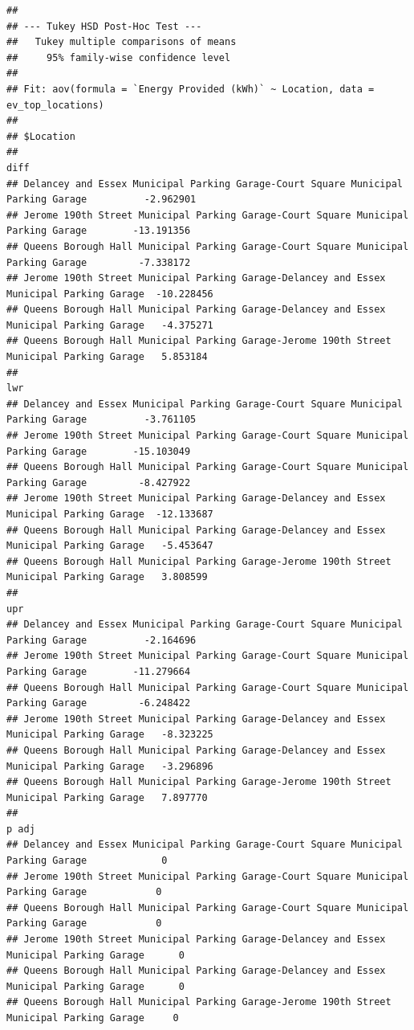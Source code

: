 \documentclass[
  12pt,
]{article}
\begin{document}
\begin{verbatim}
## 
## --- Tukey HSD Post-Hoc Test ---
##   Tukey multiple comparisons of means
##     95% family-wise confidence level
## 
## Fit: aov(formula = `Energy Provided (kWh)` ~ Location, data = ev_top_locations)
## 
## $Location
##                                                                                                 diff
## Delancey and Essex Municipal Parking Garage-Court Square Municipal Parking Garage          -2.962901
## Jerome 190th Street Municipal Parking Garage-Court Square Municipal Parking Garage        -13.191356
## Queens Borough Hall Municipal Parking Garage-Court Square Municipal Parking Garage         -7.338172
## Jerome 190th Street Municipal Parking Garage-Delancey and Essex Municipal Parking Garage  -10.228456
## Queens Borough Hall Municipal Parking Garage-Delancey and Essex Municipal Parking Garage   -4.375271
## Queens Borough Hall Municipal Parking Garage-Jerome 190th Street Municipal Parking Garage   5.853184
##                                                                                                  lwr
## Delancey and Essex Municipal Parking Garage-Court Square Municipal Parking Garage          -3.761105
## Jerome 190th Street Municipal Parking Garage-Court Square Municipal Parking Garage        -15.103049
## Queens Borough Hall Municipal Parking Garage-Court Square Municipal Parking Garage         -8.427922
## Jerome 190th Street Municipal Parking Garage-Delancey and Essex Municipal Parking Garage  -12.133687
## Queens Borough Hall Municipal Parking Garage-Delancey and Essex Municipal Parking Garage   -5.453647
## Queens Borough Hall Municipal Parking Garage-Jerome 190th Street Municipal Parking Garage   3.808599
##                                                                                                  upr
## Delancey and Essex Municipal Parking Garage-Court Square Municipal Parking Garage          -2.164696
## Jerome 190th Street Municipal Parking Garage-Court Square Municipal Parking Garage        -11.279664
## Queens Borough Hall Municipal Parking Garage-Court Square Municipal Parking Garage         -6.248422
## Jerome 190th Street Municipal Parking Garage-Delancey and Essex Municipal Parking Garage   -8.323225
## Queens Borough Hall Municipal Parking Garage-Delancey and Essex Municipal Parking Garage   -3.296896
## Queens Borough Hall Municipal Parking Garage-Jerome 190th Street Municipal Parking Garage   7.897770
##                                                                                           p adj
## Delancey and Essex Municipal Parking Garage-Court Square Municipal Parking Garage             0
## Jerome 190th Street Municipal Parking Garage-Court Square Municipal Parking Garage            0
## Queens Borough Hall Municipal Parking Garage-Court Square Municipal Parking Garage            0
## Jerome 190th Street Municipal Parking Garage-Delancey and Essex Municipal Parking Garage      0
## Queens Borough Hall Municipal Parking Garage-Delancey and Essex Municipal Parking Garage      0
## Queens Borough Hall Municipal Parking Garage-Jerome 190th Street Municipal Parking Garage     0
\end{verbatim}
\end{document}
